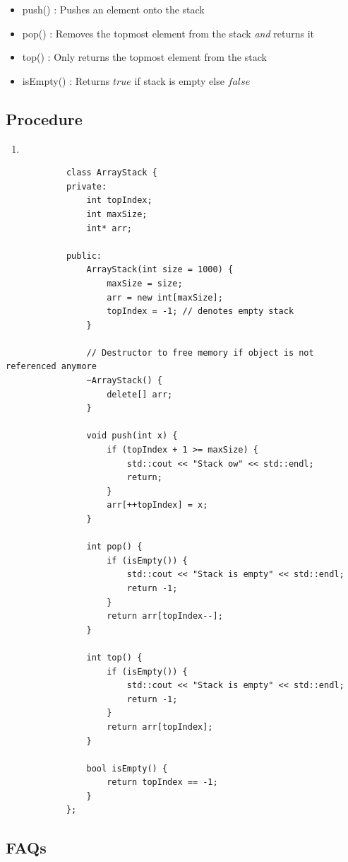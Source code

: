 \documentclass[a4paper, 12pt]{book}
\begin{document}
	\begin{itemize}
		\item push() : Pushes an element onto the stack
		\item pop() : Removes the topmost element from the stack \emph{and} returns it
		\item {top()} : Only returns the topmost element from the stack 
		\item {isEmpty()} : Returns $true$ if stack is empty else $false$
	\end{itemize}
	\vspace{\baselineskip}
	\subsection{Procedure}
	\begin{enumerate}
		\item 
	\end{enumerate}
	\newpage
	
	\begin{tcolorbox}[title=ArrayStack class]
		\begin{verbatim}
			class ArrayStack {
			private:
				int topIndex;
				int maxSize;
				int* arr;
				
			public:
				ArrayStack(int size = 1000) {
					maxSize = size;
					arr = new int[maxSize];
					topIndex = -1; // denotes empty stack
				}
				
				// Destructor to free memory if object is not referenced anymore
				~ArrayStack() {
					delete[] arr;
				}
				
				void push(int x) {
					if (topIndex + 1 >= maxSize) {
						std::cout << "Stack ow" << std::endl;
						return;
					}
					arr[++topIndex] = x;
				}
				
				int pop() {
					if (isEmpty()) {
						std::cout << "Stack is empty" << std::endl;
						return -1;
					}
					return arr[topIndex--];
				}
				
				int top() {
					if (isEmpty()) {
						std::cout << "Stack is empty" << std::endl;
						return -1;
					}
					return arr[topIndex];
				}
				
				bool isEmpty() {
					return topIndex == -1;
				}
			};
		\end{verbatim}
	\end{tcolorbox}
	
	\newpage
	
	\subsection{FAQs}
\end{document}

